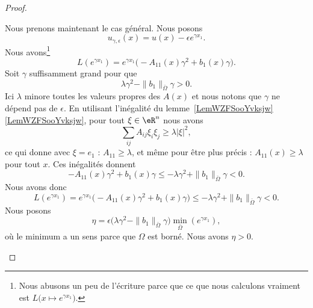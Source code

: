 \begin{proof}
\begin{subproof}
            Nous prenons maintenant le cas général. Nous posons
            \begin{equation}
                u_{\gamma,\epsilon}(x)=u(x)-\epsilon e^{\gamma x_1}.
            \end{equation}
            Nous avons\footnote{Nous abusons un peu de l'écriture parce que ce que nous calculons vraiment est \( L\big( x\mapsto  e^{\gamma x_1} \big)\).}
            \begin{equation}
                L( e^{\gamma x_1})= e^{\gamma x_1}\big( -A_{11}(x)\gamma^2+b_1(x)\gamma \big).
            \end{equation}
            Soit \( \gamma\) suffisamment grand pour que
            \begin{equation}
                \lambda\gamma^2-\| b_1 \|_{\bar \Omega}\gamma>0.
            \end{equation}
            Ici \( \lambda\) minore toutes les valeurs propres des \( A(x)\) et nous notons que \( \gamma\) ne dépend pas de \( \epsilon\). En utilisant l'inégalité du lemme~\ref{LemWZFSooYvksjw}\ref{LemWZFSooYvksjw}, pour tout \( \xi\in \eR^n\) nous avons
            \begin{equation}
                \sum_{ij}A_{ij}\xi_i\xi_j\geq \lambda| \xi |^2,
            \end{equation}
            ce qui donne avec \( \xi=e_1\) : \( A_{11}\geq \lambda\), et même pour être plus précis : \( A_{11}(x)\geq \lambda\) pour tout \( x\). Ces inégalités donnent
            \begin{equation}
                -A_{11}(x)\gamma^2+b_1(x)\gamma\leq -\lambda\gamma^2+\| b_1 \|_{\bar \Omega}\gamma<0.
            \end{equation}
            Nous avons donc
            \begin{equation}        \label{EQooXCGQooLGMnvL}
                L( e^{\gamma x_1})= e^{\gamma x_1}\big( -A_{11}(x)\gamma^2+b_1(x)\gamma \big)\leq  -\lambda\gamma^2+\| b_1 \|_{\bar \Omega}\gamma<0.
            \end{equation}
            Nous posons
            \begin{equation}
                \eta=\epsilon\big( \lambda\gamma^2-\| b_1 \|_{\bar\Omega}\gamma \big)\min_{\bar \Omega}( e^{\gamma x_1}),
            \end{equation}
            où le minimum a un sens parce que \( \Omega\) est borné. Nous avons \( \eta>0\).


\end{subproof}
\end{proof}
